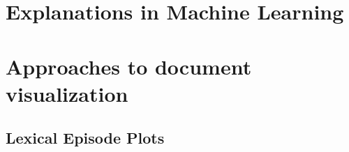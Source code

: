 \documentclass{l4proj}
\begin{document}
\section{Explanations in Machine Learning}


\autocite{ribeiroWhyShouldTrust2016}

\autocite{lundbergUnifiedApproachInterpreting2017}

\section{Approaches to document visualization}

\subsection{Lexical Episode Plots}
%
\begin{figure}
    \centering
    \begin{subfigure}[c]{0.2\textwidth}
        \centering
        \small

\end{subfigure}
\end{figure}
\end{document}
